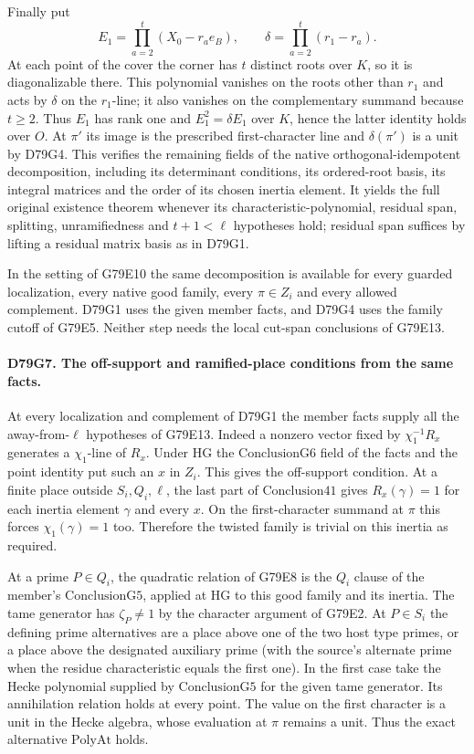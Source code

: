 Finally put
\[
 E_1=\prod_{a=2}^t (X_0-r_a e_B),\qquad
 \delta=\prod_{a=2}^t(r_1-r_a).
\]
At each point of the cover the corner has $t$ distinct roots over
$K$, so it is diagonalizable there. This polynomial vanishes on
the roots other than $r_1$ and acts by $\delta$ on the $r_1$-line;
it also vanishes on the complementary summand because $t\ge2$.
Thus $E_1$ has rank one and $E_1^2=\delta E_1$ over $K$, hence
the latter identity holds over $O$. At $\pi'$ its image is the
prescribed first-character line and $\delta(\pi')$ is a unit by
D79G4. This verifies the remaining fields of the native
orthogonal-idempotent decomposition, including its determinant
conditions, its ordered-root basis, its integral matrices and
the order of its chosen inertia element. It yields the full original
existence theorem whenever its characteristic-polynomial, residual
span, splitting, unramifiedness and $t+1<\ell$ hypotheses hold;
residual span suffices by lifting a residual matrix basis as in D79G1.

In the setting of G79E10 the same decomposition is available for
every guarded localization, every native good family, every
$\pi\in Z_i$ and every allowed complement. D79G1 uses the given
member facts, and D79G4 uses the family cutoff of G79E5. Neither
step needs the local cut-span conclusions of G79E13.

\paragraph{D79G7. The off-support and ramified-place conditions from the same facts.}
At every localization and complement of D79G1 the member facts
supply all the away-from-$\ell$ hypotheses of G79E13.
Indeed a nonzero vector fixed by $\chi_1^{-1}R_x$ generates a
$\chi_1$-line of $R_x$. Under $\mathrm{HG}$ the
$\mathrm{ConclusionG6}$ field of the facts and the point identity
put such an $x$ in $Z_i$. This gives the off-support condition.
At a finite place outside $S_i,Q_i,\ell$, the last part of
$\mathrm{Conclusion41}$ gives $R_x(\gamma)=1$ for each inertia
element $\gamma$ and every $x$. On the first-character summand
at $\pi$ this forces $\chi_1(\gamma)=1$ too. Therefore the twisted
family is trivial on this inertia as required.

At a prime $P\in Q_i$, the quadratic relation of G79E8 is the
$Q_i$ clause of the member's $\mathrm{ConclusionG5}$, applied at
$\mathrm{HG}$ to this good family and its inertia. The tame generator
has $\zeta_P\ne1$ by the character argument of G79E2. At $P\in S_i$
the defining prime alternatives are a place above one of the two
host type primes,
or a place above the designated auxiliary prime (with the source's
alternate prime when the residue characteristic equals the first one).
In the first case take the Hecke polynomial supplied by
$\mathrm{ConclusionG5}$ for the given tame generator. Its
annihilation relation holds at every point. The value on the first
character is a unit in the Hecke algebra, whose evaluation at $\pi$
remains a unit. Thus the exact alternative $\mathrm{PolyAt}$ holds.

